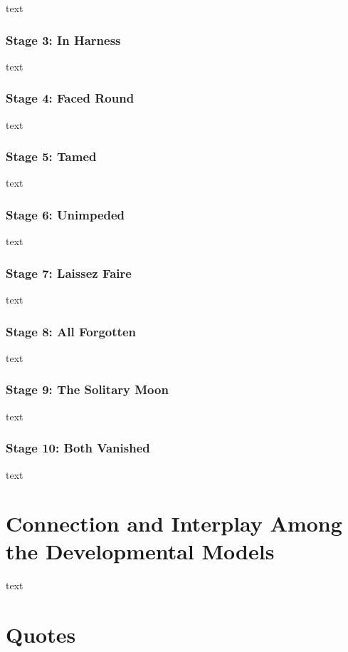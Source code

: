 text

\subsubsection{Stage 3: In Harness}

text

\subsubsection{Stage 4: Faced Round}

text

\subsubsection{Stage 5: Tamed}

text

\subsubsection{Stage 6: Unimpeded}

text

\subsubsection{Stage 7: Laissez Faire}

text

\subsubsection{Stage 8: All Forgotten}

text

\subsubsection{Stage 9: The Solitary Moon}

text

\subsubsection{Stage 10: Both Vanished}

text

\section{Connection and Interplay Among the Developmental Models}

text
\section{Quotes}

